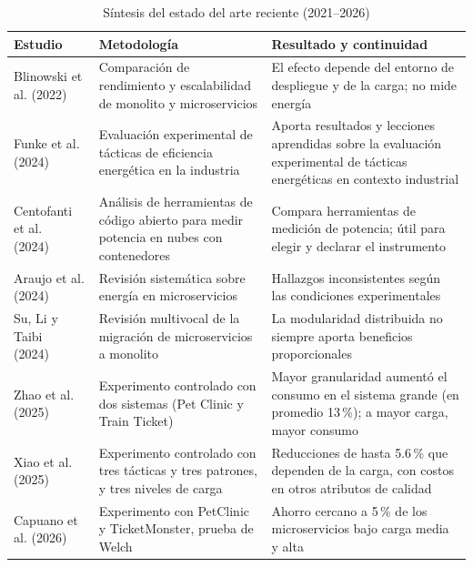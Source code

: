 \begin{table}[htbp]
\centering
\caption{Síntesis del estado del arte reciente (2021--2026)}
\label{tab:estado-arte}
\small
{}
\setlength{\parskip}{0pt}
\begin{tabular}{@{}p{3cm}p{4.6cm}p{6.6cm}@{}}
\toprule
\textbf{Estudio} & \textbf{Metodología} & \textbf{Resultado y continuidad} \\
\midrule
Blinowski et al. (2022)~\cite{blinowski2022monolithic} & Comparación de rendimiento y escalabilidad de monolito y microservicios & El efecto depende del entorno de despliegue y de la carga; no mide energía \\[4pt]
Funke et al. (2024)~\cite{funke2024tactics} & Evaluación experimental de tácticas de eficiencia energética en la industria & Aporta resultados y lecciones aprendidas sobre la evaluación experimental de tácticas energéticas en contexto industrial \\[4pt]
Centofanti et al. (2024)~\cite{centofanti2024power} & Análisis de herramientas de código abierto para medir potencia en nubes con contenedores & Compara herramientas de medición de potencia; útil para elegir y declarar el instrumento \\[4pt]
Araujo et al. (2024)~\cite{araujo2024energy} & Revisión sistemática sobre energía en microservicios & Hallazgos inconsistentes según las condiciones experimentales \\[4pt]
Su, Li y Taibi (2024)~\cite{su2024microservice} & Revisión multivocal de la migración de microservicios a monolito & La modularidad distribuida no siempre aporta beneficios proporcionales \\[4pt]
Zhao et al. (2025)~\cite{zhao2025granularity} & Experimento controlado con dos sistemas (Pet Clinic y Train Ticket) & Mayor granularidad aumentó el consumo en el sistema grande (en promedio 13\,\%); a mayor carga, mayor consumo \\[4pt]
Xiao et al. (2025)~\cite{xiao2025tactics} & Experimento controlado con tres tácticas y tres patrones, y tres niveles de carga & Reducciones de hasta 5.6\,\% que dependen de la carga, con costos en otros atributos de calidad \\[4pt]
Capuano et al. (2026)~\cite{capuano2026comparative} & Experimento con PetClinic y TicketMonster, prueba de Welch & Ahorro cercano a 5\,\% de los microservicios bajo carga media y alta \\
\bottomrule
\end{tabular}
\end{table}

